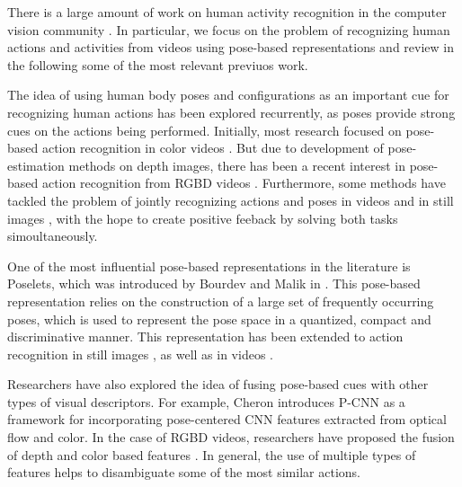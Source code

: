 There is a large amount of work on human activity recognition in the computer
vision community
\cite{Aggarwal2011,Poppe2010,vishwakarma2013survey,weinland2011survey}.
In particular, we focus on the problem of recognizing human actions and
activities from videos using pose-based representations and review in the
following some of the most relevant previuos work.

The idea of using human body poses and configurations as an important
cue for recognizing human actions has been explored recurrently,
as poses provide strong cues on the actions
being performed.
Initially, most research focused on pose-based action recognition in color
videos \cite{Feng2002, Thurau2008}.
But due to development of pose-estimation
methods on depth images\cite{Shotton:EtAl:11}, there has been a recent interest in
pose-based action recognition from RGBD videos
\cite{Escorcia2012, Hu2015, Vemulapalli2014}.
Furthermore, some methods have tackled the problem of jointly recognizing
actions and poses in videos \cite{Nie2015} and in still images \cite{Yao2010},
with the hope to create positive feeback by solving both tasks simoultaneously.

One of the most influential pose-based representations in the literature
is Poselets, which was introduced by Bourdev and Malik in \cite{Bourdev2009}.
This pose-based representation relies on the construction of a large set of
frequently occurring poses, which is used to represent the pose space in a
quantized, compact and discriminative manner.
This representation has been extended to action recognition in still
images \cite{maji2011action},
as well as in videos \cite{Tao2015, Wang2014,Zanfir2013}.


Researchers have also explored the idea of fusing pose-based cues with
other types of visual descriptors. For example, Cheron \etal \cite{Cheron2015}
introduces P-CNN as a framework for incorporating pose-centered
CNN features extracted from optical flow and color.
In the case of RGBD videos, researchers have proposed the fusion
of depth and color based features \cite{Hu2015, Kong2015}.
In general, the use of multiple types of features helps to disambiguate some
of the most similar actions.

